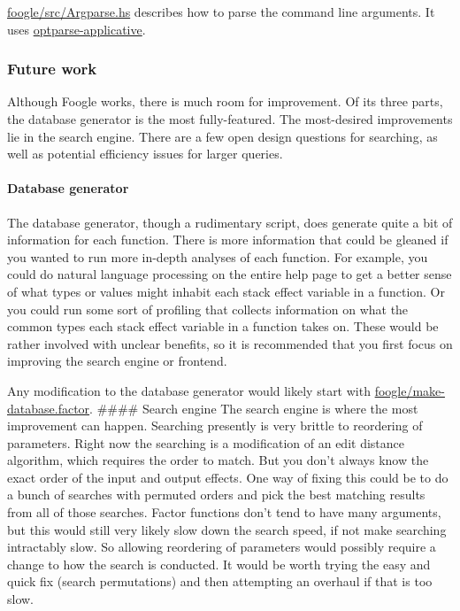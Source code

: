 \documentclass[
]{article}
\begin{document}
\href{https://github.com/factor-hmc/foogle/blob/master/src/Argparse.hs}{foogle/src/Argparse.hs}
describes how to parse the command line arguments. It uses
\href{https://hackage.haskell.org/package/optparse-applicative}{optparse-applicative}.

\hypertarget{future-work-1}{%
\subsubsection{Future work}\label{future-work-1}}

Although Foogle works, there is much room for improvement. Of its three
parts, the database generator is the most fully-featured. The
most-desired improvements lie in the search engine. There are a few open
design questions for searching, as well as potential efficiency issues
for larger queries.

\hypertarget{database-generator-1}{%
\paragraph{Database generator}\label{database-generator-1}}

The database generator, though a rudimentary script, does generate quite
a bit of information for each function. There is more information that
could be gleaned if you wanted to run more in-depth analyses of each
function. For example, you could do natural language processing on the
entire help page to get a better sense of what types or values might
inhabit each stack effect variable in a function. Or you could run some
sort of profiling that collects information on what the common types
each stack effect variable in a function takes on. These would be rather
involved with unclear benefits, so it is recommended that you first
focus on improving the search engine or frontend.

Any modification to the database generator would likely start with
\href{https://github.com/factor-hmc/foogle/blob/master/make-database.factor}{foogle/make-database.factor}.
\#\#\#\# Search engine The search engine is where the most improvement
can happen. Searching presently is very brittle to reordering of
parameters. Right now the searching is a modification of an edit
distance algorithm, which requires the order to match. But you don't
always know the exact order of the input and output effects. One way of
fixing this could be to do a bunch of searches with permuted orders and
pick the best matching results from all of those searches. Factor
functions don't tend to have many arguments, but this would still very
likely slow down the search speed, if not make searching intractably
slow. So allowing reordering of parameters would possibly require a
change to how the search is conducted. It would be worth trying the easy
and quick fix (search permutations) and then attempting an overhaul if
that is too slow.
\end{document}
